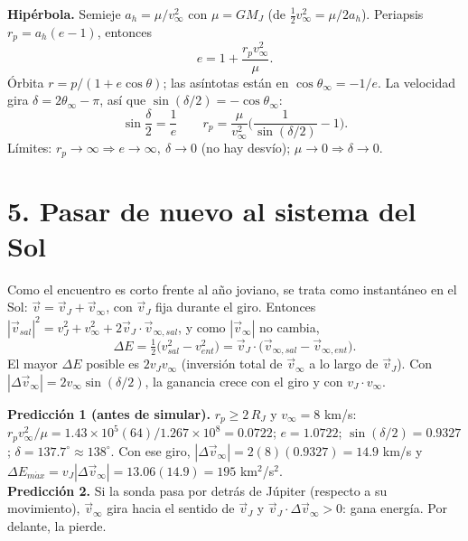 \documentclass[11pt,letterpaper]{article}
\newcommand{\vinf}{v_\infty}\newcommand{\RJ}{R_J}
\begin{document}
\textbf{Hipérbola.} Semieje $a_h=\mu/\vinf^2$ con $\mu=GM_J$ (de $\tfrac12\vinf^2=\mu/2a_h$). Periapsis $r_p=a_h(e-1)$, entonces
\[e=1+\frac{r_p\vinf^2}{\mu}.\]
Órbita $r=p/(1+e\cos\theta)$; las asíntotas están en $\cos\theta_\infty=-1/e$. La velocidad gira $\delta=2\theta_\infty-\pi$, así que $\sin(\delta/2)=-\cos\theta_\infty$:
\[\boxed{\sin\frac\delta2=\frac1e}\qquad r_p=\frac{\mu}{\vinf^2}\Big(\frac{1}{\sin(\delta/2)}-1\Big).\]
Límites: $r_p\to\infty\Rightarrow e\to\infty,\ \delta\to0$ (no hay desvío); $\mu\to0\Rightarrow\delta\to0$.

\section*{5. Pasar de nuevo al sistema del Sol}
Como el encuentro es corto frente al año joviano, se trata como instantáneo en el Sol: $\vec v=\vec v_J+\vec v_\infty$, con $\vec v_J$ fija durante el giro. Entonces $|\vec v_{sal}|^2=v_J^2+\vinf^2+2\vec v_J\cdot\vec v_{\infty,sal}$, y como $|\vec v_\infty|$ no cambia,
\[\Delta E=\tfrac12\big(v_{sal}^2-v_{ent}^2\big)=\vec v_J\cdot\big(\vec v_{\infty,sal}-\vec v_{\infty,ent}\big).\]
El mayor $\Delta E$ posible es $2v_J\vinf$ (inversión total de $\vec v_\infty$ a lo largo de $\vec v_J$). Con $|\Delta\vec v_\infty|=2\vinf\sin(\delta/2)$, la ganancia crece con el giro y con $v_J\cdot\vinf$.

\textbf{Predicción 1 (antes de simular).} $r_p\ge2\,\RJ$ y $\vinf=8$ km/s: $r_p\vinf^2/\mu=1.43\times10^5(64)/1.267\times10^8=0.0722$; $e=1.0722$; $\sin(\delta/2)=0.9327$; $\delta=137.7^\circ\approx138^\circ$. Con ese giro, $|\Delta\vec v_\infty|=2(8)(0.9327)=14.9$ km/s y $\Delta E_{m\acute{a}x}=v_J|\Delta\vec v_\infty|=13.06(14.9)=195$ km$^2$/s$^2$.\\
\textbf{Predicción 2.} Si la sonda pasa por detrás de Júpiter (respecto a su movimiento), $\vec v_\infty$ gira hacia el sentido de $\vec v_J$ y $\vec v_J\cdot\Delta\vec v_\infty>0$: gana energía. Por delante, la pierde.
\end{document}
